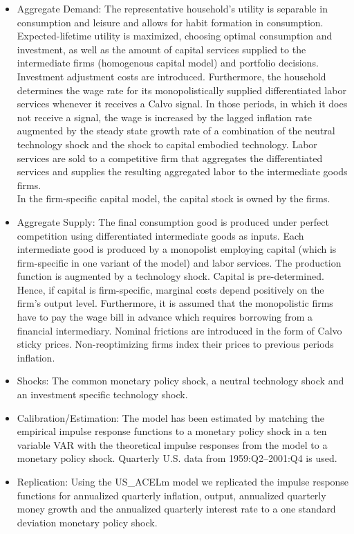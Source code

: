 \documentclass[11pt,a4paper]{article}
\begin{document}
	\begin{itemize}
		\item Aggregate Demand: The representative household's utility is separable in consumption and leisure and allows for habit formation in consumption. Expected-lifetime utility is maximized, choosing optimal consumption and investment, as well as the amount of capital services supplied to the intermediate firms (homogenous capital model) and portfolio decisions. Investment adjustment costs are introduced. Furthermore, the household determines the wage rate for its monopolistically supplied differentiated labor services whenever it receives a Calvo signal. In those periods, in which it does not receive a signal, the wage is increased by the lagged inflation rate augmented by the steady state growth rate of a combination of the neutral technology shock and the shock to capital embodied technology. Labor services are sold to a competitive firm that aggregates the differentiated services and supplies the resulting aggregated labor to the intermediate goods firms. \\
		In the firm-specific capital model, the capital stock is owned by the firms.
		\item Aggregate Supply:
		The final consumption good is produced under perfect competition using differentiated intermediate goods as inputs. Each intermediate good is produced by a monopolist employing capital (which is firm-specific in one variant of the model) and labor services. The production function is augmented by a technology shock. Capital is pre-determined. Hence, if capital is firm-specific, marginal costs depend positively on the firm's output level. Furthermore, it is assumed that the monopolistic firms have to pay the wage bill in advance which requires borrowing from a financial intermediary. Nominal frictions are introduced in the form of Calvo sticky prices. Non-reoptimizing firms index their prices to previous periods inflation.
		\item Shocks: The common monetary policy shock, a neutral technology shock and an investment specific technology shock. %
		\item Calibration/Estimation: The model has been estimated by matching the empirical impulse response functions to a monetary policy shock in a ten variable VAR with the theoretical impulse responses from the model to a monetary policy shock. Quarterly U.S. data from 1959:Q2--2001:Q4 is used.
		\item Replication: Using the US\_ACELm model we replicated the impulse response functions for annualized quarterly inflation, output, annualized quarterly money growth and the annualized quarterly interest rate to a one standard deviation monetary policy shock.
		

\end{itemize}
\end{document}
